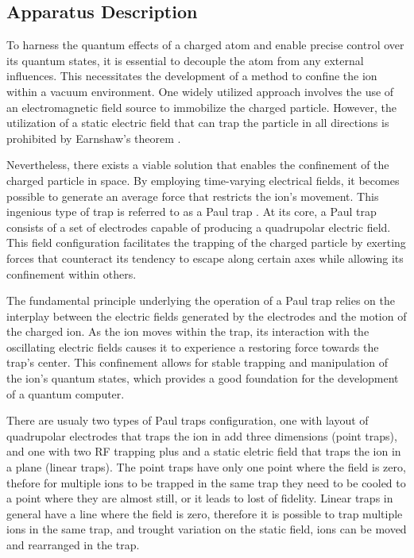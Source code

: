 \documentclass[
  journal=largetwo,
  year=2023,
]{cup-journal}
\begin{document}
\subsection{Apparatus Description}
\label{sec:apparatus_description}

To harness the quantum effects of a charged atom and enable precise control over its quantum states, it is essential to decouple the atom from any external influences. This necessitates the development of a method to confine the ion within a vacuum environment. One widely utilized approach involves the use of an electromagnetic field source to immobilize the charged particle. However, the utilization of a static electric field that can trap the particle in all directions is prohibited by Earnshaw's theorem \autocite{jones_1980_earnshaws}.

Nevertheless, there exists a viable solution that enables the confinement of the charged particle in space. By employing time-varying electrical fields, it becomes possible to generate an average force that restricts the ion's movement. This ingenious type of trap is referred to as a Paul trap \autocite{paul_1953_notizen}. At its core, a Paul trap consists of a set of electrodes capable of producing a quadrupolar electric field. This field configuration facilitates the trapping of the charged particle by exerting forces that counteract its tendency to escape along certain axes while allowing its confinement within others.

The fundamental principle underlying the operation of a Paul trap relies on the interplay between the electric fields generated by the electrodes and the motion of the charged ion. As the ion moves within the trap, its interaction with the oscillating electric fields causes it to experience a restoring force towards the trap's center. This confinement allows for stable trapping and manipulation of the ion's quantum states, which provides a good foundation for the development of a quantum computer.

There are usualy two types of Paul traps configuration, one with layout of quadrupolar electrodes that traps the ion in add three dimensions (point traps), and one with two RF trapping plus and a static eletric field that traps the ion in a plane (linear traps).
The point traps have only one point where the field is zero, thefore for multiple ions to be trapped in the same trap they need to be cooled to a point where they are almost still, or it leads to lost of fidelity.
Linear traps in general have a line where the field is zero, therefore it is possible to trap multiple ions in the same trap, and trought variation on the static field, ions can be moved and rearranged in the trap.
\end{document}
